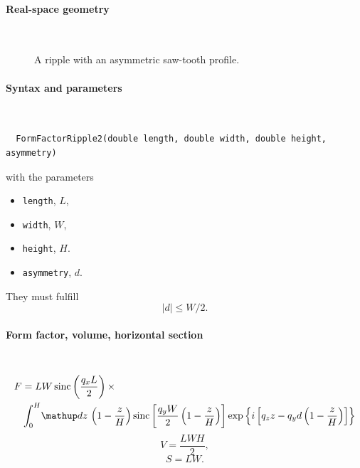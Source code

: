 \paragraph{Real-space geometry}\strut\\

\begin{figure}[H]
\hfill
{}
\hfill
{}
\hfill
{}
\hfill
\caption{A ripple with an asymmetric saw-tooth profile.}
\end{figure}

\FloatBarrier

\paragraph{Syntax and parameters}\strut\\[-2ex plus .2ex minus .2ex]
\begin{lstlisting}
  FormFactorRipple2(double length, double width, double height, asymmetry)
\end{lstlisting}
with the parameters
\begin{itemize}
\item \texttt{length}, $L$,
\item \texttt{width}, $W$,
\item \texttt{height}, $H$.
\item \texttt{asymmetry}, $d$.
\end{itemize}
They must fulfill
\begin{displaymath}
  |d| \le W/2.
\end{displaymath}

\paragraph{Form factor, volume, horizontal section}\strut\\
\begin{align*}
F &=L W
\sinc\left(\frac{q_xL}{2}\right)\times \\ &
\int_0^H \!\d z\,
\left(1-\frac{z}{H}\right)
 \sinc\left[\frac{q_y
    W}{2}\left(1-\frac{z}{H}\right)\right]
\exp\left\{ i\left[q_zz -
    q_yd\left(1-\frac{z}{H}\right)\right]\right\}
\end{align*}
\begin{equation*}
  V = \dfrac{L W H}{2},
\end{equation*}
\begin{equation*}
  S = L W.
\end{equation*}

